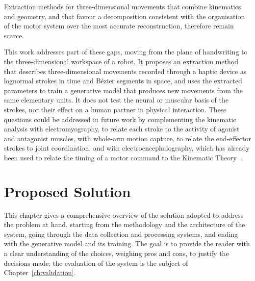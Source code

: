 \documentclass[12pt]{report}
\begin{document}
Extraction methods for three-dimensional movements that combine kinematics and geometry, and that favour a decomposition consistent with the organisation of the motor system over the most accurate reconstruction, therefore remain scarce.

This work addresses part of these gaps, moving from the plane of handwriting to the three-dimensional workspace of a robot. It proposes an extraction method that describes three-dimensional movements recorded through a haptic device as lognormal strokes in time and Bézier segments in space, and uses the extracted parameters to train a generative model that produces new movements from the same elementary units. It does not test the neural or muscular basis of the strokes, nor their effect on a human partner in physical interaction. These questions could be addressed in future work by complementing the kinematic analysis with electromyography, to relate each stroke to the activity of agonist and antagonist muscles, with whole-arm motion capture, to relate the end-effector strokes to joint coordination, and with electroencephalography, which has already been used to relate the timing of a motor command to the Kinematic Theory~\cite{oreilly2013eeg}.

\chapter{Proposed Solution}

This chapter gives a comprehensive overview of the solution adopted to address the problem at hand, starting from the methodology and the architecture of the system, going through the data collection and processing systems, and ending with the generative model and its training. The goal is to provide the reader with a clear understanding of the choices, weighing pros and cons, to justify the decisions made; the evaluation of the system is the subject of Chapter~\ref{ch:validation}.
\end{document}
